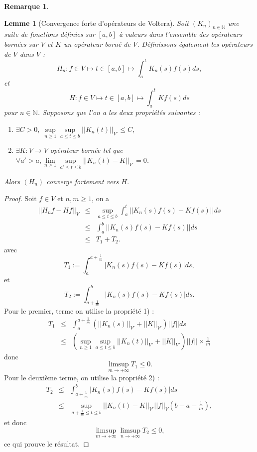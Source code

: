 \documentclass[12pt,openany,a4paper, titlepage]{article}
\newcommand{\f}[2]{\frac{#1}{#2}}
\newcommand{\lp}{\left(}
\newcommand{\rp}{\right)}
\newcommand{\lb}{\left|}
\newcommand{\rb}{\right|}
\newcommand{\N}{\mathbb{N}}
\newtheorem{lem}{Lemme}
\theoremstyle{definition}
\theoremstyle{definition}
\theoremstyle{definition}
\theoremstyle{definition}
\theoremstyle{definition}
\newtheorem{rem}{Remarque}
\theoremstyle{definition}
\begin{document}
\begin{rem}
\begin{lem} [Convergence forte d'opérateurs de Voltera]
Soit $(K_n)_{n\in\N}$ une suite de fonctions définies sur $[a,b]$ à valeurs dans l'ensemble des opérateurs bornées sur $V$ et $K$ un opérateur borné de $V$.
Définissons également les opérateurs de $V$ dans $V$ :
$$H_n :f\in V \mapsto t\in[a,b] \mapsto \int_a^t K_n(s)f(s)ds,$$ 
et
$$H :f\in V \mapsto t\in[a,b] \mapsto \int_a^t Kf(s)ds$$ 
pour $n\in\N$.
Supposons que l'on a les deux propriétés suivantes :
\begin{enumerate}
    \item $\exists C > 0, \; \sup\limits_{n\geq 1}\sup\limits_{a\leq t \leq b } ||K_n(t)||_{V'} \leq C$,
    \item $\exists K:V\rightarrow V$ opérateur bornée tel que $\forall a'>a, \lim\limits_{n\geq 1}\sup\limits_{a'\leq t \leq b } ||K_n(t) - K||_{V'} = 0 $. 
\end{enumerate}
Alors $(H_n)$ converge fortement vers $H$.
\end{lem}
\begin{proof}
Soit $f\in V$ et $n, m\geq 1$, on a 
\begin{eqnarray}
\lb\lb H_nf - Hf \rb\rb_V &\leq& \sup\limits_{a\leq t\leq b} \int_a^t ||K_n(s)f(s) - Kf(s)||ds \\
                          &\leq& \int_a^b ||K_n(s)f(s) - Kf(s)||ds \\
                          &\leq& T_1 + T_2.
\end{eqnarray}
avec
\begin{equation}
T_1 :=  \int_a^{a+\f{1}{m}} |K_n(s)f(s) - Kf(s)|ds,
\end{equation}
et 
\begin{equation}
T_2 :=  \int_{a+\f{1}{m}}^b |K_n(s)f(s) - Kf(s)|ds.
\end{equation}
Pour le premier, terme on utilise la propriété 1) : 
\begin{eqnarray}
T_1 &\leq& \int_a^{a+\f{1}{m}} \lp ||K_n(s)||_{V'} + ||K||_{V'}\rp ||f|| ds \\
    &\leq& \lp \sup\limits_{n\geq 1}\sup\limits_{a\leq t \leq b } ||K_n(t)||_{V'} + ||K||_{V'}\rp ||f|| \times \f{1}{m}
\end{eqnarray}
donc 
\begin{equation}
\limsup\limits_{m\rightarrow +\infty} T_1 \leq  0.
\end{equation}
Pour le deuxième terme, on utilise la propriété 2) :
\begin{eqnarray}
T_2 &\leq& \int_{a+\f{1}{m}}^b |K_n(s)f(s) - Kf(s)|ds \\
    &\leq& \sup\limits_{a+\f{1}{m} \leq t \leq b} ||K_n(t) - K||_{V'} ||f||_V \lp b - a - \f{1}{m} \rp,
\end{eqnarray}
et donc
\begin{equation}
\limsup\limits_{m\rightarrow +\infty}\limsup\limits_{n\rightarrow +\infty} T_2 \leq  0,
\end{equation}
ce qui prouve le résultat.
\end{proof}


\end{rem}
\end{document}
